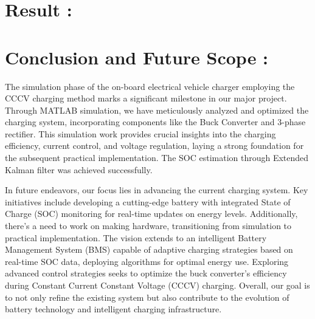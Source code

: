 \documentclass[conference]{IEEEtran}
\begin{document}
\section{Result :}
\section{Conclusion and Future Scope :}
The simulation phase of the on-board electrical vehicle charger employing the CCCV charging method marks a significant milestone in our major project. Through MATLAB simulation, we have meticulously analyzed and optimized the charging system, incorporating components like the Buck Converter and 3-phase rectifier. This simulation work provides crucial insights into the charging efficiency, current control, and voltage regulation, laying a strong foundation for the subsequent practical implementation. The SOC estimation through Extended Kalman filter was achieved successfully.

In future endeavors, our focus lies in advancing the current charging system. Key initiatives include developing a cutting-edge battery with integrated State of Charge (SOC) monitoring for real-time updates on energy levels. Additionally, there's a need to work on making hardware, transitioning from simulation to practical implementation. The vision extends to an intelligent Battery Management System (BMS) capable of adaptive charging strategies based on real-time SOC data, deploying algorithms for optimal energy use. Exploring advanced control strategies seeks to optimize the buck converter’s efficiency during Constant Current Constant Voltage (CCCV) charging. Overall, our goal is to not only refine the existing system but also contribute to the evolution of battery technology and intelligent charging infrastructure.
\end{document}
